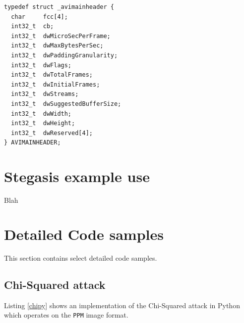 \documentclass[paper=a4, fontsize=11pt,twoside]{scrartcl}
\numberwithin{table}{section}
\numberwithin{figure}{section}
\numberwithin{algorithm}{section}
\begin{document}
\begin{lstlisting}[caption={The \texttt{AVIMAINHEADER} structure.},frame=single, upquote=true,label=aviheader,showstringspaces=false]
typedef struct _avimainheader {
  char     fcc[4];
  int32_t  cb;
  int32_t  dwMicroSecPerFrame;
  int32_t  dwMaxBytesPerSec;
  int32_t  dwPaddingGranularity;
  int32_t  dwFlags;
  int32_t  dwTotalFrames;
  int32_t  dwInitialFrames;
  int32_t  dwStreams;
  int32_t  dwSuggestedBufferSize;
  int32_t  dwWidth;
  int32_t  dwHeight;
  int32_t  dwReserved[4];
} AVIMAINHEADER;
\end{lstlisting}


\section{Stegasis example use} 
\label{app:steg}

Blah

\section{Detailed Code samples} 
\label{app:code}

This section contains select detailed code samples.

\subsection{Chi-Squared attack}
\label{app:chi}

Listing \ref{chipy} shows an implementation of the Chi-Squared attack in Python which operates on the \texttt{PPM} image format.
\end{document}
